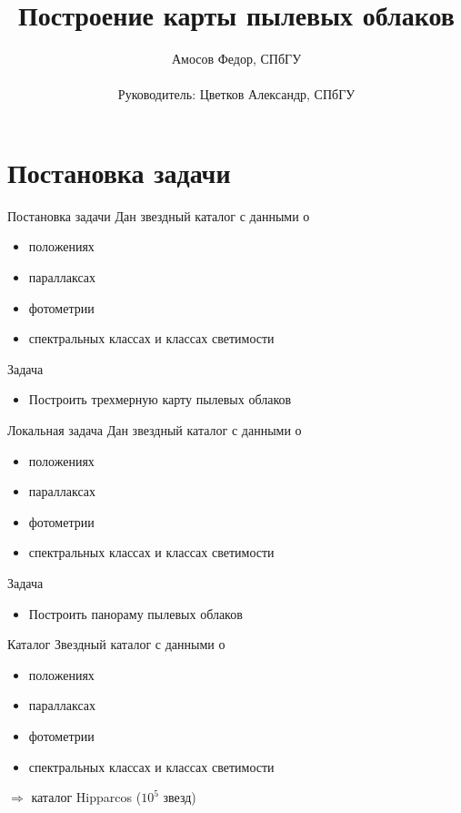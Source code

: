 \documentclass[14pt, fleqn, xcolor={dvipsnames, table}]{beamer}
\title{Построение карты пылевых облаков\\\small{}}
\author[]{
    \small{
        Амосов Федор, СПбГУ\\
        ~\\
        Руководитель: Цветков Александр, СПбГУ
    }
}
\date{}
\begin{document}
    \begin{frame}
        \maketitle
        \small
    \end{frame}

    \section{Постановка задачи}  
    
        \begin{frame}{Постановка задачи}
            Дан звездный каталог с данными о
            \begin{itemize}
                \item положениях
                \item параллаксах
                \item фотометрии
                \item спектральных классах и классах светимости
            \end{itemize}  
            Задача
            \begin{itemize}
                \item Построить трехмерную карту пылевых облаков 
            \end{itemize}         
        \end{frame}
        
        \begin{frame}{Локальная задача}
            Дан звездный каталог с данными о
            \begin{itemize}
                \item положениях
                \item параллаксах
                \item фотометрии
                \item спектральных классах и классах светимости
            \end{itemize}  
            Задача
            \begin{itemize}
                \item Построить панораму пылевых облаков
            \end{itemize}         
        \end{frame}
        
        \begin{frame}{Каталог}
            Звездный каталог с данными о
            \begin{itemize}
                \item положениях
                \item параллаксах
                \item фотометрии
                \item спектральных классах и классах светимости
            \end{itemize}  
            $\Longrightarrow$ каталог Hipparcos ($10^5$ звезд)
        \end{frame}
        
\end{document}
